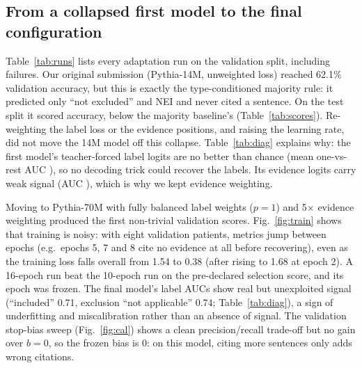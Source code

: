 


\subsection{From a collapsed first model to the final configuration}
Table~\ref{tab:runs} lists every adaptation run on the validation split, including failures. Our original submission (Pythia-14M, unweighted loss) reached 62.1\% validation accuracy, but this is exactly the type-conditioned majority rule: it predicted only ``not excluded'' and NEI and never cited a sentence. On the test split it scored \TestFirstAcc{} accuracy, below the majority baseline's \TestMajAcc{} (Table~\ref{tab:scores}). Re-weighting the label loss or the evidence positions, and raising the learning rate, did not move the 14M model off this collapse. Table~\ref{tab:diag} explains why: the first model's teacher-forced label logits are no better than chance (mean one-vs-rest AUC \DiagSmallFirst), so no decoding trick could recover the labels. Its evidence logits carry weak signal (AUC \DiagEvSmallFirst), which is why we kept evidence weighting.

Moving to Pythia-70M with fully balanced label weights ($p{=}1$) and 5$\times$ evidence weighting produced the first non-trivial validation scores. Fig.~\ref{fig:train} shows that training is noisy: with eight validation patients, metrics jump between epochs (e.g.\ epochs 5, 7 and 8 cite no evidence at all before recovering), even as the training loss falls overall from 1.54 to 0.38 (after rising to 1.68 at epoch 2). A 16-epoch run beat the 10-epoch run on the pre-declared selection score, and its epoch \SelEpoch{} was frozen. The final model's label AUCs show real but unexploited signal (``included'' 0.71, exclusion ``not applicable'' 0.74; Table~\ref{tab:diag}), a sign of underfitting and miscalibration rather than an absence of signal. The validation stop-bias sweep (Fig.~\ref{fig:cal}) shows a clean precision/recall trade-off but no gain over $b{=}0$, so the frozen bias is 0: on this model, citing more sentences only adds wrong citations.

